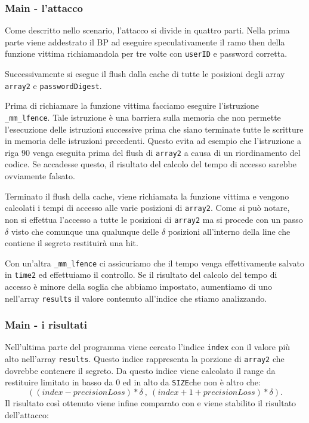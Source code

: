 				\subsubsection{Main - l'attacco}
				
				Come descritto nello scenario, l'attacco si divide in quattro parti. Nella prima parte viene addestrato il \ac{BP} ad eseguire speculativamente il ramo then della funzione vittima richiamandola per tre volte con \texttt{userID} e password corretta.
				
				Successivamente si esegue il flush dalla cache di tutte le posizioni degli array \texttt{array2} e \texttt{passwordDigest}.
				
				Prima di richiamare la funzione vittima facciamo eseguire l'istruzione \texttt{\_mm\_lfence}. Tale istruzione è una barriera sulla memoria che non permette l'esecuzione delle istruzioni successive prima che siano terminate tutte le scritture in memoria delle istruzioni precedenti. Questo evita ad esempio che l'istruzione a riga $90$ venga eseguita prima del flush di \texttt{array2} a causa di un riordinamento del codice. Se accadesse questo, il risultato del calcolo del tempo di accesso sarebbe ovviamente falsato.
				
				Terminato il flush della cache, viene richiamata la funzione vittima e vengono calcolati i tempi di accesso alle varie posizioni di \texttt{array2}. Come si può notare, non si effettua l'accesso a tutte le posizioni di \texttt{array2} ma si procede con un passo $\delta$ visto che comunque una qualunque delle $\delta$ posizioni all'interno della line che contiene il segreto restituirà una hit.
				
				Con un'altra \texttt{\_mm\_lfence} ci assicuriamo che il tempo venga effettivamente salvato in \texttt{time2} ed effettuiamo il controllo. Se il risultato del calcolo del tempo di accesso è minore della soglia che abbiamo impostato, aumentiamo di uno nell'array \texttt{results} il valore  contenuto all'indice che stiamo analizzando.
				
				\subsubsection{Main - i risultati}
				
				Nell'ultima parte del programma viene cercato l'indice \texttt{index} con il valore più alto nell'array \texttt{results}. Questo indice rappresenta la porzione di \texttt{array2} che dovrebbe contenere il segreto. Da questo indice viene calcolato il range da restituire limitato in basso da $0$ ed in alto da \texttt{SIZE}che non è altro che: $$((index - precisionLoss) * \delta\ ,\ (index + 1 + precisionLoss) * \delta).$$ Il risultato così ottenuto viene infine comparato con  e viene stabilito il risultato dell'attacco:
				
